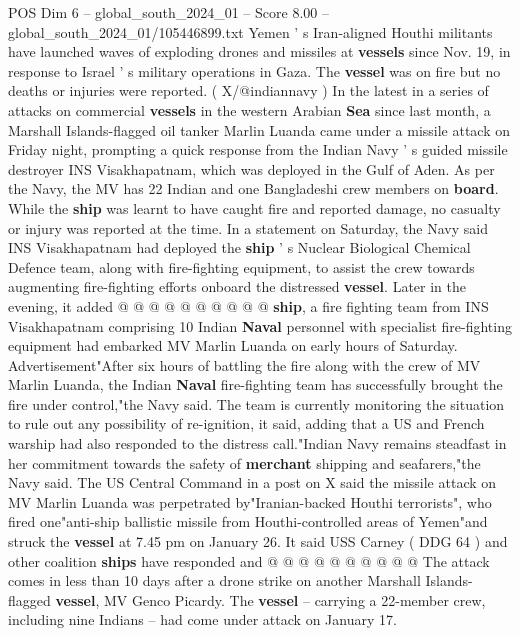 \begin{textsample}{POS Dim 6 – global\_south\_2024\_01 – Score 8.00 – global\_south\_2024\_01/105446899.txt}  \label{ex:f6_pos_092}
Yemen ' s Iran-aligned Houthi militants have launched waves of exploding drones and missiles at \textbf{vessels} since Nov. 19, in response to Israel ' s military operations in Gaza.
The \textbf{vessel} was on fire but no deaths or injuries were reported. ( X/@indiannavy ) In the latest in a series of attacks on commercial \textbf{vessels} in the western Arabian \textbf{Sea} since last month, a Marshall Islands-flagged oil tanker Marlin Luanda came under a missile attack on Friday night, prompting a quick response from the Indian Navy ' s guided missile destroyer INS Visakhapatnam, which was deployed in the Gulf of Aden.
As per the Navy, the MV has 22 Indian and one Bangladeshi crew members on \textbf{board}.
While the \textbf{ship} was learnt to have caught fire and reported damage, no casualty or injury was reported at the time.
In a statement on Saturday, the Navy said INS Visakhapatnam had deployed the \textbf{ship} ' s Nuclear Biological Chemical Defence team, along with fire-fighting equipment, to assist the crew towards augmenting fire-fighting efforts onboard the distressed \textbf{vessel}.
Later in the evening, it added @ @ @ @ @ @ @ @ @ @ \textbf{ship}, a fire fighting team from INS Visakhapatnam comprising 10 Indian \textbf{Naval} personnel with specialist fire-fighting equipment had embarked MV Marlin Luanda on early hours of Saturday.
Advertisement"After six hours of battling the fire along with the crew of MV Marlin Luanda, the Indian \textbf{Naval} fire-fighting team has successfully brought the fire under control,"the Navy said.
The team is currently monitoring the situation to rule out any possibility of re-ignition, it said, adding that a US and French warship had also responded to the distress call."Indian Navy remains steadfast in her commitment towards the safety of \textbf{merchant} shipping and seafarers,"the Navy said.
The US Central Command in a post on X said the missile attack on MV Marlin Luanda was perpetrated by"Iranian-backed Houthi terrorists", who fired one"anti-ship ballistic missile from Houthi-controlled areas of Yemen"and struck the \textbf{vessel} at 7.45 pm on January 26.
It said USS Carney ( DDG 64 ) and other coalition \textbf{ships} have responded and @ @ @ @ @ @ @ @ @ @ The attack comes in less than 10 days after a drone strike on another Marshall Islands-flagged \textbf{vessel}, MV Genco Picardy.
The \textbf{vessel} -- carrying a 22-member crew, including nine Indians -- had come under attack on January 17.

\end{textsample}

